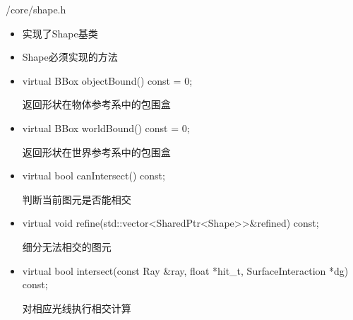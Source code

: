 \documentclass{beamer}
\begin{document}
\begin{frame} {/core/shape.h}
\begin{itemize}
\item 实现了Shape基类
\item Shape必须实现的方法
\item
\begin{semiverbatim} \small virtual BBox objectBound() const = 0; \end{semiverbatim}
返回形状在物体参考系中的包围盒
\item
\begin{semiverbatim} \small virtual BBox worldBound() const = 0; \end{semiverbatim}
返回形状在世界参考系中的包围盒
\item
\begin{semiverbatim} \small virtual bool canIntersect() const; \end{semiverbatim}
判断当前图元是否能相交
\item
\begin{semiverbatim} \small virtual void refine(std::vector<SharedPtr<Shape>>\&refined) const; \end{semiverbatim}
细分无法相交的图元
\item
\begin{semiverbatim} \small virtual bool intersect(const Ray \&ray, float *hit\_t, SurfaceInteraction *dg) const; \end{semiverbatim}
对相应光线执行相交计算
\end{itemize}
\end{frame}
\end{document}
